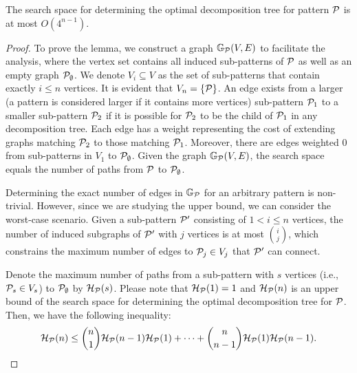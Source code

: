 {\begin{lemma}
\label{lem:complexity-of-graph-aware}
The search space for determining the optimal decomposition tree for pattern $\mathcal{P}$ is at most $O(4^{n-1})$.
\end{lemma}



\begin{proof}
    To prove the lemma, we construct a graph $\mathbb{G}_{\mathcal{P}}(V, E)$ to facilitate the analysis, where the vertex set contains all induced sub-patterns of $\mathcal{P}$ as well as an empty graph $\mathcal{P}_{\emptyset}$.
    We denote $V_i \subseteq V$ as the set of sub-patterns that contain exactly $i \leq n$ vertices. It is evident that $V_n = \{\mathcal{P}\}$.
    An edge exists from a larger (a pattern is considered larger if it contains more vertices) sub-pattern $\mathcal{P}_1$ to a smaller sub-pattern $\mathcal{P}_2$ if it is possible for $\mathcal{P}_2$ to be the child of $\mathcal{P}_1$ in any decomposition tree. Each edge has a weight representing the cost of extending graphs matching $\mathcal{P}_2$ to those matching $\mathcal{P}_1$.
    Moreover, there are edges weighted 0 from sub-patterns in $V_1$ to $\mathcal{P}_{\emptyset}$.
    Given the graph $\mathbb{G}_{\mathcal{P}}(V, E)$, %
    the search space equals the number of paths from $\mathcal{P}$ to $\mathcal{P}_{\emptyset}$.

    Determining the exact number of edges in $\mathbb{G}_{\mathcal{P}}$ for an arbitrary pattern is non-trivial. However, since we are studying the upper bound, we can consider the worst-case scenario. Given a sub-pattern $\mathcal{P}'$ consisting of $1 < i \leq n$ vertices, the number of induced subgraphs of $\mathcal{P}'$ with $j$ vertices is at most $\binom{i}{j}$, which constrains the maximum number of edges to $\mathcal{P}_j \in V_j$ that $\mathcal{P}'$ can connect.

    Denote the maximum number of paths from a sub-pattern with $s$ vertices (i.e., $\mathcal{P}_s \in V_s$) to $\mathcal{P}_{\emptyset}$ by $\mathcal{H}_{\mathcal{P}}(s)$.
    Please note that $\mathcal{H}_{\mathcal{P}}(1) = 1$ and $\mathcal{H}_{\mathcal{P}}(n)$ is an upper bound of the search space for determining the optimal decomposition tree for $\mathcal{P}$.
    Then, we have the following inequality:
    \begin{equation*}
        \mathcal{H}_{\mathcal{P}}(n) \leq \binom{n}{1}\mathcal{H}_{\mathcal{P}}(n-1)\mathcal{H}_{\mathcal{P}}(1) + \cdots + \binom{n}{n-1}\mathcal{H}_{\mathcal{P}}(1)\mathcal{H}_{\mathcal{P}}(n-1).
    \end{equation*}


\end{proof}}
